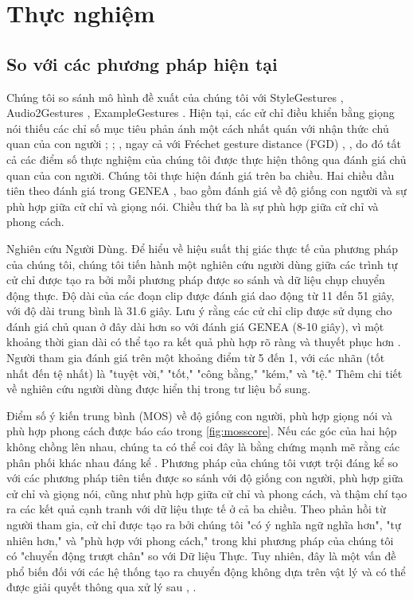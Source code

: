 \chapter{Thực nghiệm}
\label{Chapter4}

\section{So với các phương pháp hiện tại}
\label{sec:result}


Chúng tôi so sánh mô hình đề xuất của chúng tôi với StyleGestures \cite{alexanderson2020style}, Audio2Gestures \cite{li2021audio2gestures}, ExampleGestures \cite{ghorbani2023zeroeggs}. Hiện tại, các cử chỉ điều khiển bằng giọng nói thiếu các chỉ số mục tiêu phản ánh một cách nhất quán với nhận thức chủ quan của con người \cite{yoon2022genea}; \cite{kucherenko2021large}; \cite{alexanderson2022listen}, ngay cả với Fréchet gesture distance (FGD) \cite{yoon2022genea}, \cite{dabral2023mofusion}, do đó tất cả các điểm số thực nghiệm của chúng tôi được thực hiện thông qua đánh giá chủ quan của con người. Chúng tôi thực hiện đánh giá trên ba chiều. Hai chiều đầu tiên theo đánh giá trong GENEA \cite{yoon2022genea}, bao gồm đánh giá về độ giống con người và sự phù hợp giữa cử chỉ và giọng nói. Chiều thứ ba là sự phù hợp giữa cử chỉ và phong cách.

Nghiên cứu Người Dùng. Để hiểu về hiệu suất thị giác thực tế của phương pháp của chúng tôi, chúng tôi tiến hành một nghiên cứu người dùng giữa các trình tự cử chỉ được tạo ra bởi mỗi phương pháp được so sánh và dữ liệu chụp chuyển động thực. Độ dài của các đoạn clip được đánh giá dao động từ 11 đến 51 giây, với độ dài trung bình là 31.6 giây. Lưu ý rằng các cử chỉ clip được sử dụng cho đánh giá chủ quan ở đây dài hơn so với đánh giá GENEA \cite{yoon2022genea} (8-10 giây), vì một khoảng thời gian dài có thể tạo ra kết quả phù hợp rõ ràng và thuyết phục hơn \cite{yang2022reprgesture}. Người tham gia đánh giá trên một khoảng điểm từ 5 đến 1, với các nhãn (tốt nhất đến tệ nhất) là "tuyệt vời," "tốt," "công bằng," "kém," và "tệ." Thêm chi tiết về nghiên cứu người dùng được hiển thị trong tư liệu bổ sung.

Điểm số ý kiến trung bình (MOS) về độ giống con người, phù hợp giọng nói và phù hợp phong cách được báo cáo trong \autoref{fig:mosscore}. Nếu các góc của hai hộp không chồng lên nhau, chúng ta có thể coi đây là bằng chứng mạnh mẽ rằng các phân phối khác nhau đáng kể \cite{mcgill1978variations}. Phương pháp của chúng tôi vượt trội đáng kể so với các phương pháp tiên tiến được so sánh với độ giống con người, phù hợp giữa cử chỉ và giọng nói, cũng như phù hợp giữa cử chỉ và phong cách, và thậm chí tạo ra các kết quả cạnh tranh với dữ liệu thực tế ở cả ba chiều. Theo phản hồi từ người tham gia, cử chỉ được tạo ra bởi chúng tôi "có ý nghĩa ngữ nghĩa hơn", "tự nhiên hơn," và "phù hợp với phong cách," trong khi phương pháp của chúng tôi có "chuyển động trượt chân" so với Dữ liệu Thực. Tuy nhiên, đây là một vấn đề phổ biến đối với các hệ thống tạo ra chuyển động không dựa trên vật lý và có thể được giải quyết thông qua xử lý sau \cite{ghorbani2023zeroeggs}, \cite{luvizon2023scene}.

